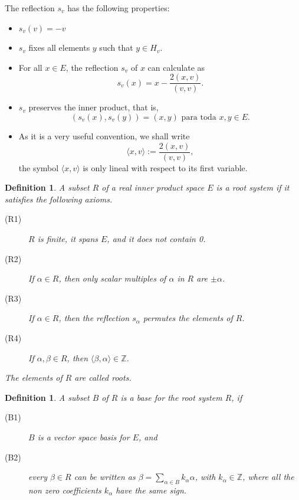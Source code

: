 \documentclass[12pt,a4paper]{article}
\newtheorem{definition}[Theorem]{Definition}
\begin{document}
The reflection $s_v$ has the following properties:
\begin{itemize}
\item [(i)] $s_v(v)=-v$
\item  [(ii)] $s_v$ fixes all elements $y$ such that $y \in H_v$.
\item [(iii)] For all $x \in E$, the reflection $s_v$ of $x$ can calculate as
\begin{equation}
s_v(x)=x-\frac{2(x,v)}{(v,v)}.
\label{eq31}
\end{equation}
\item [(iv)] $s_v$ preserves the inner product, that is,
$$(s_v(x),s_v(y))=(x,y) \text{ para toda } x,y \in E.$$
\item [(v)] As it is a very useful convention, we shall write \begin{equation}
\langle x,v \rangle:=\frac{2(x,v)}{(v,v)},
\label{eq32}
\end{equation}
the symbol $\langle x,v \rangle$ is only lineal with respect to its first variable.
\end{itemize}

\begin{definition}\label{rootsystem}
A subset $R$ of a real inner product space $E$ is a \textit{root system} if it satisfies the following axioms.
\begin{description}
\item[(R1)] $R$ is finite, it spans $E$, and it does not contain 0.
\item[(R2)] If $\alpha \in R$, then only scalar multiples of $\alpha$ in $R$ are $\pm \alpha$.
\item[(R3)] If $\alpha \in R$, then the reflection $s_\alpha$ permutes the elements of $R$.
\item[(R4)] If $\alpha, \beta \in R$, then $\langle \beta, \alpha \rangle \in \mathbb{Z}$.
\end{description}

The elements of $R$ are called \textit{roots}.
\end{definition}

\begin{definition}
A subset $B$ of $R$ is a \textit{base} for the root system $R$, if
\begin{description}
\item [(B1)] $B$ is a vector space basis for $E$, and
\item [(B2)] every $\beta \in R$ can be written as $\beta = \sum_{\alpha \in B} k_{\alpha}\alpha$, with $k_{\alpha} \in \mathbb{Z}$, where all the non zero coefficients $k_{\alpha}$ have the same sign.
\end{description}
\end{definition}
\end{document}
